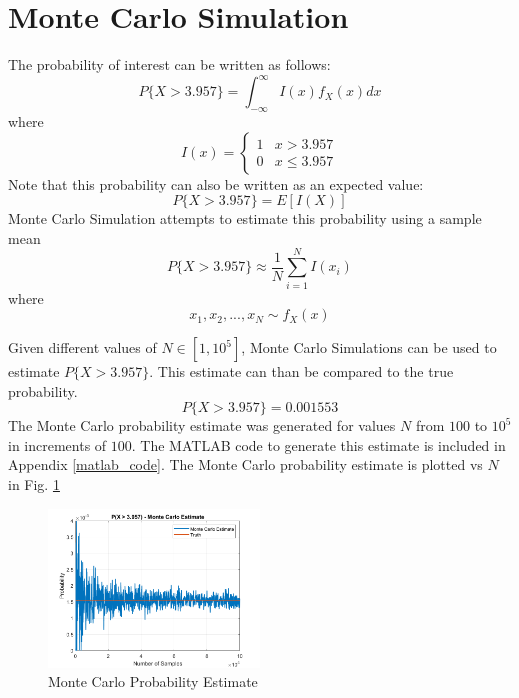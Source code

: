 \documentclass[conference]{IEEEtran}
\begin{document}
\section{Monte Carlo Simulation}
The probability of interest can be written as follows:
\begin{equation}
P\{X > 3.957\} = \int_{-\infty}^{\infty}I(x)f_X(x)dx
\end{equation}
where
\begin{equation}
I(x) = \begin{cases}
1 & x > 3.957 \\
0 & x \leq 3.957
\end{cases}
\end{equation}
Note that this probability can also be written as an expected value:
\begin{equation}
P\{X > 3.957\} = E[I(X)]
\end{equation}
Monte Carlo Simulation attempts to estimate this probability using a sample mean
\begin{equation}
P\{X > 3.957\} \approx \frac{1}{N}\sum_{i=1}^{N}I(x_i)
\end{equation}
where
\begin{equation}
x_1, x_2, ..., x_N \sim f_X(x)
\end{equation}
\par
Given different values of $N \in [1, 10^5]$, Monte Carlo Simulations can be used to estimate $P\{X > 3.957\}$. This estimate can than be compared to the true probability.
\begin{equation}
P\{X > 3.957\} = 0.001553
\end{equation}
The Monte Carlo probability estimate was generated for values $N$ from $100$ to $10^5$ in increments of $100$. The MATLAB code to generate this estimate is included in Appendix \ref{matlab_code}. The Monte Carlo probability estimate is plotted vs $N$ in Fig. \ref{Monte Carlo Estimate}
\begin{figure}[H]
\centerline{\includegraphics[width=0.5\textwidth]{Monte_Carlo_Estimate.png}}
\caption{Monte Carlo Probability Estimate}
\label{Monte Carlo Estimate}
\end{figure}
\end{document}
